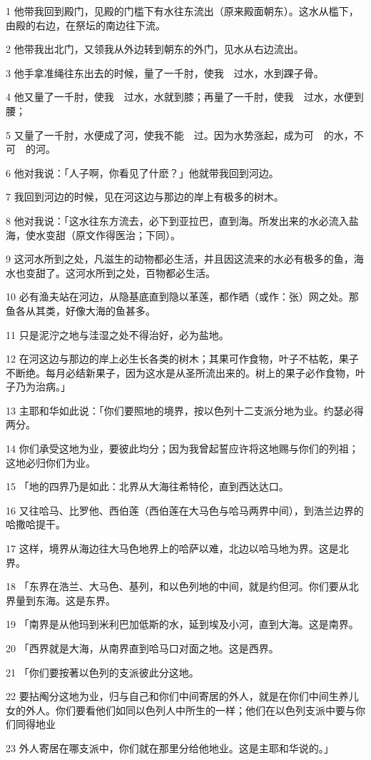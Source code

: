 \par 1 他带我回到殿门，见殿的门槛下有水往东流出（原来殿面朝东）。这水从槛下，由殿的右边，在祭坛的南边往下流。
\par 2 他带我出北门，又领我从外边转到朝东的外门，见水从右边流出。
\par 3 他手拿准绳往东出去的时候，量了一千肘，使我　过水，水到踝子骨。
\par 4 他又量了一千肘，使我　过水，水就到膝；再量了一千肘，使我　过水，水便到腰；
\par 5 又量了一千肘，水便成了河，使我不能　过。因为水势涨起，成为可　的水，不可　的河。
\par 6 他对我说：「人子啊，你看见了什麽？」他就带我回到河边。
\par 7 我回到河边的时候，见在河这边与那边的岸上有极多的树木。
\par 8 他对我说：「这水往东方流去，必下到亚拉巴，直到海。所发出来的水必流入盐海，使水变甜（原文作得医治；下同）。
\par 9 这河水所到之处，凡滋生的动物都必生活，并且因这流来的水必有极多的鱼，海水也变甜了。这河水所到之处，百物都必生活。
\par 10 必有渔夫站在河边，从隐基底直到隐以革莲，都作晒（或作：张）网之处。那鱼各从其类，好像大海的鱼甚多。
\par 11 只是泥泞之地与洼湿之处不得治好，必为盐地。
\par 12 在河这边与那边的岸上必生长各类的树木；其果可作食物，叶子不枯乾，果子不断绝。每月必结新果子，因为这水是从圣所流出来的。树上的果子必作食物，叶子乃为治病。」
\par 13 主耶和华如此说：「你们要照地的境界，按以色列十二支派分地为业。约瑟必得两分。
\par 14 你们承受这地为业，要彼此均分；因为我曾起誓应许将这地赐与你们的列祖；这地必归你们为业。
\par 15 「地的四界乃是如此：北界从大海往希特伦，直到西达达口。
\par 16 又往哈马、比罗他、西伯莲（西伯莲在大马色与哈马两界中间），到浩兰边界的哈撒哈提干。
\par 17 这样，境界从海边往大马色地界上的哈萨以难，北边以哈马地为界。这是北界。
\par 18 「东界在浩兰、大马色、基列，和以色列地的中间，就是约但河。你们要从北界量到东海。这是东界。
\par 19 「南界是从他玛到米利巴加低斯的水，延到埃及小河，直到大海。这是南界。
\par 20 「西界就是大海，从南界直到哈马口对面之地。这是西界。
\par 21 「你们要按著以色列的支派彼此分这地。
\par 22 要拈阄分这地为业，归与自己和你们中间寄居的外人，就是在你们中间生养儿女的外人。你们要看他们如同以色列人中所生的一样；他们在以色列支派中要与你们同得地业
\par 23 外人寄居在哪支派中，你们就在那里分给他地业。这是主耶和华说的。」

